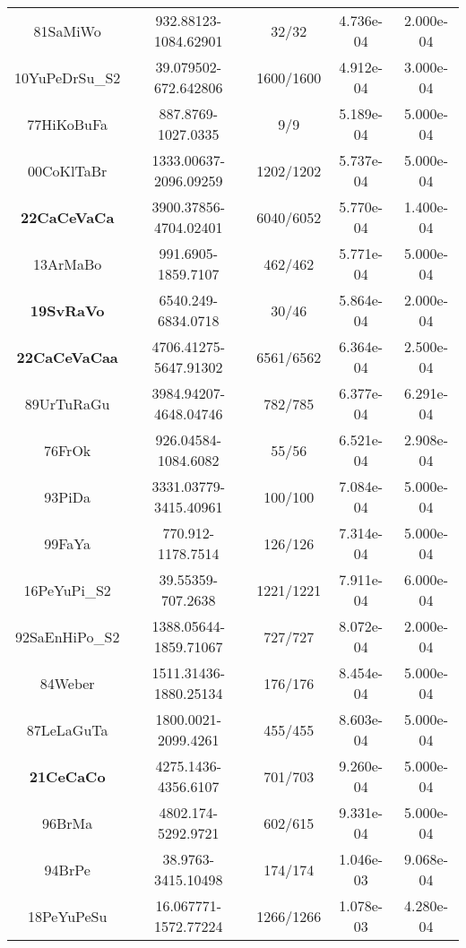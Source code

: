 \begin{longtable}{c c c c c}
    81SaMiWo \cite{81SaMiWo} & 932.88123-1084.62901 & 32/32 & 4.736e-04 & 2.000e-04 \\
    10YuPeDrSu\_S2 \cite{10YuPeDrSu} & 39.079502-672.642806 & 1600/1600 & 4.912e-04 & 3.000e-04 \\
    77HiKoBuFa \cite{77HiKoBuFa} & 887.8769-1027.0335 & 9/9 & 5.189e-04 & 5.000e-04 \\
    00CoKlTaBr \cite{00CoKlTaBr} & 1333.00637-2096.09259 & 1202/1202 & 5.737e-04 & 5.000e-04 \\
    \textbf{22CaCeVaCa} \cite{22CaCeVaCa} & 3900.37856-4704.02401 & 6040/6052 & 5.770e-04 & 1.400e-04 \\
    13ArMaBo \cite{13ArMaBo} & 991.6905-1859.7107 & 462/462 & 5.771e-04 & 5.000e-04 \\
    \textbf{19SvRaVo} \cite{19SvRaVo} & 6540.249-6834.0718 & 30/46 & 5.864e-04 & 2.000e-04 \\
    \textbf{22CaCeVaCaa} \cite{22CaCeVaCaa} & 4706.41275-5647.91302 & 6561/6562 & 6.364e-04 & 2.500e-04 \\
    89UrTuRaGu \cite{89UrTuRaGu} & 3984.94207-4648.04746 & 782/785 & 6.377e-04 & 6.291e-04 \\
    76FrOk \cite{76FrOk} & 926.04584-1084.6082 & 55/56 & 6.521e-04 & 2.908e-04 \\
    93PiDa \cite{93PiDa} & 3331.03779-3415.40961 & 100/100 & 7.084e-04 & 5.000e-04 \\
    99FaYa \cite{99FaYa} & 770.912-1178.7514 & 126/126 & 7.314e-04 & 5.000e-04 \\
    16PeYuPi\_S2 \cite{16PeYuPi} & 39.55359-707.2638 & 1221/1221 & 7.911e-04 & 6.000e-04 \\
    92SaEnHiPo\_S2 \cite{92SaEnHiPo} & 1388.05644-1859.71067 & 727/727 & 8.072e-04 & 2.000e-04 \\
    84Weber \cite{84Weber} & 1511.31436-1880.25134 & 176/176 & 8.454e-04 & 5.000e-04 \\
    87LeLaGuTa \cite{87LeLaGuTa} & 1800.0021-2099.4261 & 455/455 & 8.603e-04 & 5.000e-04 \\
    \textbf{21CeCaCo} \cite{21CeCaCo} & 4275.1436-4356.6107 & 701/703 & 9.260e-04 & 5.000e-04 \\
    96BrMa \cite{96BrMa} & 4802.174-5292.9721 & 602/615 & 9.331e-04 & 5.000e-04 \\
    94BrPe \cite{94BrPe} & 38.9763-3415.10498 & 174/174 & 1.046e-03 & 9.068e-04 \\
    18PeYuPeSu \cite{18PeYuPeSu} & 16.067771-1572.77224 & 1266/1266 & 1.078e-03 & 4.280e-04 \\

\end{longtable}
